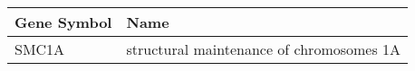 \begin{tabular}{ll}
\toprule
Gene Symbol &                                     Name \\
\midrule
      SMC1A & structural maintenance of chromosomes 1A \\
\bottomrule
\end{tabular}

